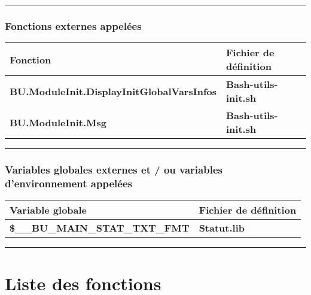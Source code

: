 \documentclass[a4paper,10pt]{article}
\begin{document}
\setlength{\parskip}{2em}



\color{sec3}\par\noindent\rule{\textwidth}{0.4pt}\color{text}\setlength{\parskip}{1em}

\color{sec3}
\subsubsection{Fonctions externes appelées}\color{text}

\begin{justify}
    \begin{tabular}{|l|l|}
        \hline
        \textbf{Fonction} & \textbf{Fichier de définition}\\
        \hline
        \textbf{\color{func}BU.ModuleInit.DisplayInitGlobalVarsInfos} & \textbf{\color{path}Bash-utils-init.sh}\\
        \hline
        \textbf{\color{func}BU.ModuleInit.Msg}                        & \textbf{\color{path}Bash-utils-init.sh}\\
        \hline
    \end{tabular}
\end{justify}

\setlength{\parskip}{2em}



\color{sec3}\par\noindent\rule{\textwidth}{0.4pt}\color{text}\setlength{\parskip}{1em}

\color{sec3}
\subsubsection{Variables globales externes et / ou variables d'environnement appelées}\color{text}

\begin{justify}
    \begin{tabular}{|l|l|}
        \hline
        \textbf{Variable globale} & \textbf{Fichier de définition}\\
        \hline
        \textbf{\color{vars}\$\_\_BU\_MAIN\_STAT\_TXT\_FMT} & \textbf{\color{path}Statut.lib}\\
        \hline
    \end{tabular}
\end{justify}

\setlength{\parskip}{2em}





\color{sec1}\par\noindent\rule{\textwidth}{0.4pt}\color{text}

\color{sec1}
\section{Liste des fonctions}\color{text}
\end{document}
